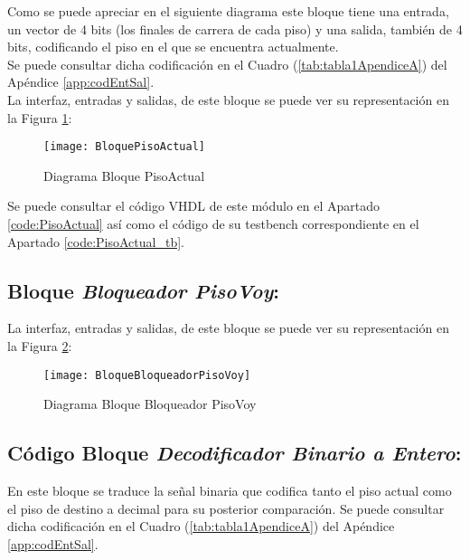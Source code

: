     Como se puede apreciar en el siguiente diagrama este bloque tiene una entrada, un vector de 4 bits (los finales de carrera de cada piso) y una salida, también de 4 bits, codificando el piso en el que se encuentra actualmente. \\ 
    
    Se puede consultar dicha codificación en el Cuadro (\ref{tab:tabla1ApendiceA}) del Apéndice \ref{app:codEntSal}. \\ 
    
    La interfaz, entradas y salidas, de este bloque se puede ver su representación en la Figura \ref{fig:BloquePisoActual}:
    
    \begin{figure}[H]
		    \centering
		    \hspace*{-1.8cm}
		    \texttt{[image: BloquePisoActual]}
		    \caption{Diagrama Bloque PisoActual}
		    \label{fig:BloquePisoActual}
	\end{figure}
	
	Se puede consultar el código VHDL de este módulo en el Apartado \ref{code:PisoActual} así como el código de su testbench correspondiente en el Apartado \ref{code:PisoActual_tb}.\\ 

\subsection{Bloque \textit{Bloqueador PisoVoy}:}
    
    La interfaz, entradas y salidas, de este bloque se puede ver su representación en la Figura \ref{fig:BloqueBloqueadorPisoVoy}:
    
    \begin{figure}[H]
		    \centering
		    \hspace*{-1.8cm}
		    \texttt{[image: BloqueBloqueadorPisoVoy]}
		    \caption{Diagrama Bloque Bloqueador PisoVoy}
		    \label{fig:BloqueBloqueadorPisoVoy}
	\end{figure}
	
\subsection{Código Bloque \textit{Decodificador Binario a Entero}:} \label{bloque:DecodificadorBinarioEntero}
	En este bloque se traduce la señal binaria que codifica tanto el piso actual como el piso de destino a decimal para su posterior comparación.
	Se puede consultar dicha codificación en el Cuadro (\ref{tab:tabla1ApendiceA}) del Apéndice \ref{app:codEntSal}. \\ 

